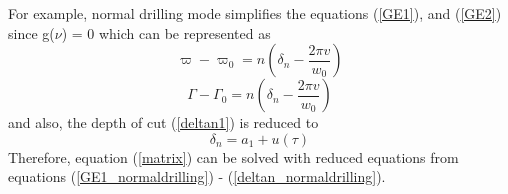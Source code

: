 For example, normal drilling mode simplifies the equations (\ref{GE1}), and (\ref{GE2}) since g($\nu$) = 0 which can be represented as
\begin{equation}\label{GE1_normaldrilling}
  \varpi-\varpi_0 = n\left(\delta_n - \frac{2\pi v}{w_0}\right)
\end{equation}
\begin{equation}\label{GE2_normaldrilling}
  \Gamma-\Gamma_0 = n\left(\delta_n - \frac{2\pi v}{w_0}\right)
\end{equation}
and also, the depth of cut (\ref{deltan1}) is reduced to
\begin{equation}\label{deltan_normaldrilling}
  \delta_n = a_1 + u(\tau)
\end{equation}
Therefore, equation (\ref{matrix}) can be solved with reduced equations from equations (\ref{GE1_normaldrilling}) - (\ref{deltan_normaldrilling}).
